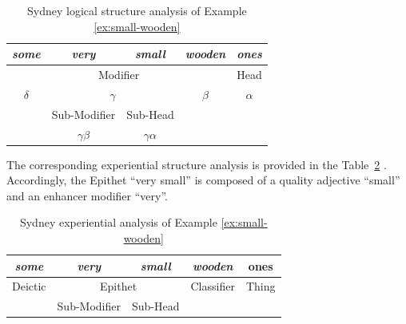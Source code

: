 \begin{table}[!ht]
    \centering
    \begin{tabular}{c|c|c|cc}
        \hline
        \multicolumn{1}{|c|}{\textit{some}} & \textit{very} & \textit{small} & \multicolumn{1}{c|}{\textit{wooden}} & \multicolumn{1}{c|}{\textit{ones}} \\ \hline
        \multicolumn{4}{|c|}{Modifier}                                                                              & \multicolumn{1}{c|}{Head}          \\ \hline
        \multicolumn{1}{|c|}{$\delta$}             & \multicolumn{2}{c|}{$\gamma$}         & \multicolumn{1}{c|}{$\beta$}               & \multicolumn{1}{c|}{$\alpha$}             \\ \hline
        & Sub-Modifier  & Sub-Head       &                                      &                                    \\ \cline{2-3}    
        \multicolumn{1}{l|}{}               & \multicolumn{1}{c|}{$\gamma\beta$} & \multicolumn{1}{c|}{$\gamma\alpha$} & \multicolumn{1}{l}{}                 & \multicolumn{1}{l}{}               \\ \cline{2-3}
    \end{tabular}
    \caption{Sydney logical structure analysis of Example \ref{ex:small-wooden}}
    \label{tab:example-substructure-analisys-logical}
\end{table}

The corresponding experiential structure analysis is provided in the \mbox{Table \ref{tab:example-substructure-analisys}} \citet[391]{Halliday2013}. Accordingly, the Epithet ``very small'' is composed of a quality adjective ``small'' and an enhancer modifier ``very''. 
 
\begin{table}[!ht]
    \centering
    \begin{tabular}{c|c|c|cc}
        \hline
        \multicolumn{1}{|c|}{\textit{some}}    & \textit{very}            & \textit{small}      & \multicolumn{1}{c|}{\textit{wooden}}     & \multicolumn{1}{c|}{ones}  \\ \hline
        \multicolumn{1}{|c|}{Deictic} & \multicolumn{2}{c|}{Epithet} & \multicolumn{1}{c|}{Classifier} & \multicolumn{1}{c|}{Thing} \\ \hline
        & Sub-Modifier  & Sub-Head   & \multicolumn{2}{c}{}                                         \\ \cline{2-3}
    \end{tabular}
    \caption{Sydney experiential analysis of Example \ref{ex:small-wooden}}
    \label{tab:example-substructure-analisys}
\end{table}

